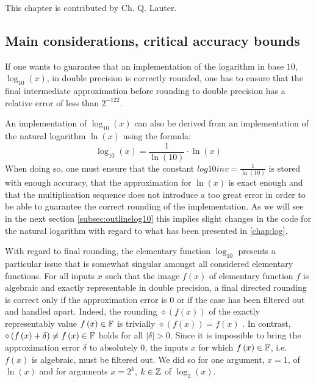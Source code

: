 This chapter is contributed by Ch. Q. Lauter.

\subsection{Main considerations, critical accuracy bounds}\label{subsec:criticalboundslog10}
% 
If one wants to guarantee that an implementation of the logarithm in
base $10$, $\log_{10}\left( x \right)$, in double precision is
correctly rounded, one has to ensure that the final intermediate
approximation before rounding to double precision has a relative error
of less than $2^{-122}$.

An implementation of $\log_{10}\left(x\right)$ can also be derived from an
implementation of the natural logarithm $\ln\left(x\right)$ using the formula:
$$\log_{10}\left( x \right) = \frac{1}{\ln\left( 10 \right)} \cdot
\ln\left( x \right)$$ When doing so, one must ensure that the constant
$\mathit{log10inv} = \frac{1}{\ln\left(10\right)}$ is stored with
enough accuracy, that the approximation for $\ln\left( x \right)$ is
exact enough and that the multiplication sequence does not introduce a
too great error in order to be able to guarantee the correct rounding
of the implementation. As we will see in the next section
\ref{subsec:outlinelog10} this implies slight changes in the code for
the natural logarithm with regard to what has been presented in
 \ref{chap:log}.

With regard to final rounding, the elementary function $\log_{10}$
presents a particular issue that is somewhat singular amongst all
considered elementary functions. For all inputs $x$ such that the
image $f\left(x\right)$ of elementary function $f$ is algebraic and
exactly representable in double precision, a final directed rounding
is correct only if the approximation error is $0$ or if the case has
been filtered out and handled apart. Indeed, the rounding
$\diamond\left( f\left( x \right) \right)$ of the exactly
representably value $f\left(x\right) \in \mathbb {F}$ is trivially
$\diamond\left( f\left( x \right) \right) = f\left( x \right)$
\cite{IEEE754}. In contrast, $\diamond\left( f\left( x \right) +
\delta \right) \not = f\left( x \right) \in \mathbb {F}$ holds for all $\left
\vert \delta \right \vert > 0$. Since it is impossible to bring the
approximation error $\delta$ to absolutely $0$, the inputs $x$ for
which $f\left(x\right) \in \mathbb {F}$, i.e. $f\left(x\right)$ is algebraic,
must be filtered out. We did so for one argument, $x=1$, of $\ln\left(
x \right)$ and for arguments $x = 2^k$, $k \in \mathbb {Z}$ of $\log_2\left(
x\right)$.

